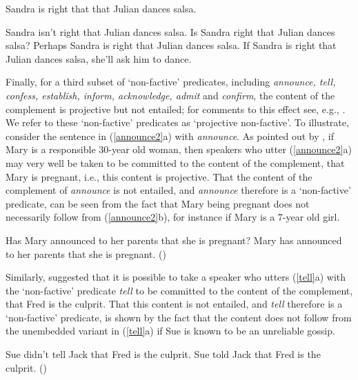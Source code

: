 \documentclass[11pt,fleqn]{article}
\newcommand{\6}{\mbox{$[\hspace*{-.6mm}[$}}
\newcommand{\9}{\mbox{$]\hspace*{-.6mm}]$}}
\begin{document}
\begin{exe}
\ex\label{right} Sandra is right that that Julian dances salsa.
\ex\label{right2} 

\begin{xlist} 
\ex Sandra isn't right that Julian dances salsa. 
\ex Is Sandra right that Julian dances salsa?
\ex Perhaps Sandra is right that Julian dances salsa.
\ex If Sandra is right that Julian dances salsa, she'll ask him to dance. 
\end{xlist}
\end{exe}
Finally, for a third subset of `non-factive' predicates, including {\em announce, tell, confess, establish, inform, acknowledge, admit} and {\em confirm}, the content of the complement is projective but not entailed; for comments to this effect see, e.g., \citealt{reis1973,melvold1991,schultz2003,swanson2012,anand-hacquard2014,spector-egre2015,karttunen2016,tbd-variability}.  We refer to these `non-factive' predicates as `projective non-factive'. To illustrate, consider the sentence in (\ref{announce2}a) with {\em announce}. As pointed out by \citet[139]{schlenker10}, if Mary is a responsible 30-year old woman, then speakers who utter (\ref{announce2}a) may very well be taken to be committed to the content of the complement, that Mary is pregnant, i.e., this content is projective. That the content of the complement of {\em announce} is not entailed, and {\em announce} therefore is a `non-factive' predicate, can be seen from the fact that Mary being pregnant does not necessarily follow from (\ref{announce2}b), for instance if Mary is a 7-year old girl.

\begin{exe}
\ex\label{announce2} 
\begin{xlist}
\ex Has Mary announced to her parents that she is pregnant? 
\ex Mary has announced to her parents that she is pregnant. \hfill (\citealt[139]{schlenker10})
\end{xlist}
\end{exe}
Similarly, \citet{spector-egre2015} suggested that it is possible to take a speaker who utters (\ref{tell}a) with the `non-factive' predicate {\em tell}  to be committed to the content of the complement, that Fred is the culprit. That this content is not entailed, and {\em tell} therefore is a `non-factive' predicate, is shown by the fact that the content does not follow from the unembedded variant in (\ref{tell}a) if Sue is known to be an unreliable gossip.

\begin{exe}
\ex\label{tell}
\begin{xlist}
\ex Sue didn't tell Jack that Fred is the culprit. 
\ex Sue told Jack that Fred is the culprit. \hfill (\citealt[1739]{spector-egre2015})
\end{xlist}
\end{exe}
\end{document}
